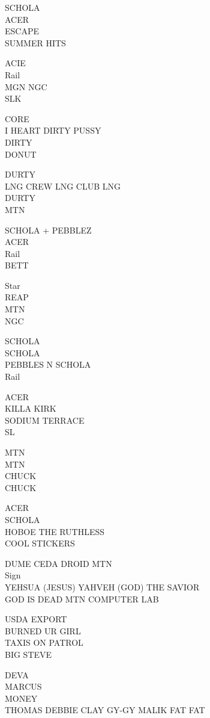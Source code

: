 \documentclass[10pt,letterpaper]{article}
\begin{document}
SCHOLA\\
ACER\\
ESCAPE\\
SUMMER HITS

ACIE\\
Rail\\
MGN NGC\\
SLK

CORE\\
I HEART DIRTY PUSSY\\
DIRTY\\
DONUT

DURTY\\
LNG CREW LNG CLUB LNG\\
DURTY\\
MTN

SCHOLA + PEBBLEZ\\
ACER\\
Rail\\
BETT

Star\\
REAP\\
MTN\\
NGC

SCHOLA\\
SCHOLA\\
PEBBLES N SCHOLA\\
Rail

ACER\\
KILLA KIRK\\
SODIUM TERRACE\\
SL

MTN\\
MTN\\
CHUCK\\
CHUCK

ACER\\
SCHOLA\\
HOBOE THE RUTHLESS\\
COOL STICKERS

DUME CEDA DROID MTN\\
Sign\\
YEHSUA (JESUS) YAHVEH (GOD) THE SAVIOR\\
GOD IS DEAD MTN COMPUTER LAB

USDA EXPORT\\
BURNED UR GIRL\\
TAXIS ON PATROL\\
BIG STEVE

DEVA\\
MARCUS\\
MONEY\\
THOMAS DEBBIE CLAY GY{-}GY MALIK FAT FAT
\end{document}

